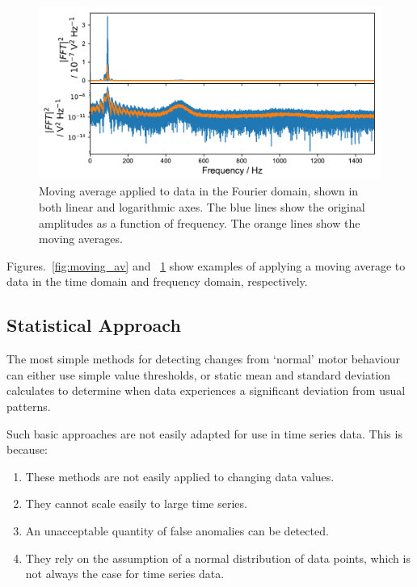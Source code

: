 \begin{figure}[t]
    \includegraphics[width=1.0\textwidth]{fig/freq_moving_average.pdf}
    \caption[Moving Average in Fourier Domain]{Moving average applied to data in the Fourier domain, shown in both linear and logarithmic axes. The blue lines show the original amplitudes as a function of frequency. The orange lines show the moving averages.}
    \label{fig:freq_moving_av}
\end{figure}

Figures.~\ref{fig:moving_av} and ~\ref{fig:freq_moving_av} show examples of applying a moving average to data in the time domain and frequency domain, respectively. 



\subsection{Statistical Approach}

The most simple methods for detecting changes from `normal' motor behaviour can either use simple value thresholds, or static mean and standard deviation calculates to determine when data experiences a significant deviation from usual patterns. 

Such basic approaches are not easily adapted for use in time series data. This is because:

\begin{enumerate}
    \item These methods are not easily applied to changing data values.
    \item They cannot scale easily to large time series.
    \item An unacceptable quantity of false anomalies can be detected.
    \item They rely on the assumption of a normal distribution of data points, which is not always the case for time series data.
\end{enumerate}

